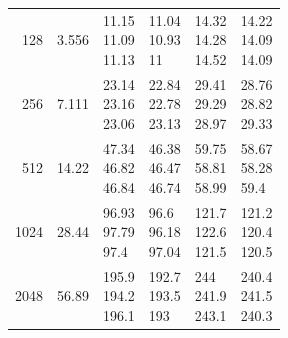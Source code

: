 \begin{longtable}{rrp{2.85cm}p{2.85cm}p{2.85cm}p{2.85cm}}
128 & 3.556 & \shortstack[r]{11.15\\11.09\\11.13} & \shortstack[r]{11.04\\10.93\\11} & \shortstack[r]{14.32\\14.28\\14.52} & \shortstack[r]{14.22\\14.09\\14.09} \\
256 & 7.111 & \shortstack[r]{23.14\\23.16\\23.06} & \shortstack[r]{22.84\\22.78\\23.13} & \shortstack[r]{29.41\\29.29\\28.97} & \shortstack[r]{28.76\\28.82\\29.33} \\
512 & 14.22 & \shortstack[r]{47.34\\46.82\\46.84} & \shortstack[r]{46.38\\46.47\\46.74} & \shortstack[r]{59.75\\58.81\\58.99} & \shortstack[r]{58.67\\58.28\\59.4} \\
1024 & 28.44 & \shortstack[r]{96.93\\97.79\\97.4} & \shortstack[r]{96.6\\96.18\\97.04} & \shortstack[r]{121.7\\122.6\\121.5} & \shortstack[r]{121.2\\120.4\\120.5} \\
2048 & 56.89 & \shortstack[r]{195.9\\194.2\\196.1} & \shortstack[r]{192.7\\193.5\\193} & \shortstack[r]{244\\241.9\\243.1} & \shortstack[r]{240.4\\241.5\\240.3} \\

\end{longtable}
